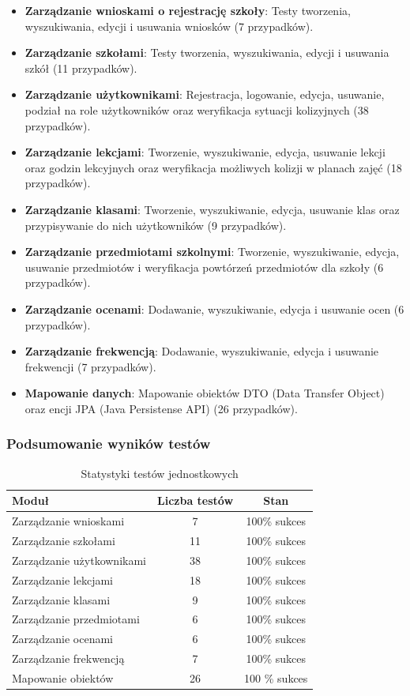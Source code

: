 \documentclass[12pt,a4paper]{article}
\begin{document}
\begin{itemize}
    \item \textbf{Zarządzanie wnioskami o rejestrację szkoły}: Testy tworzenia, wyszukiwania, edycji i usuwania wniosków (7 przypadków).
    \item \textbf{Zarządzanie szkołami}: Testy tworzenia, wyszukiwania, edycji i usuwania szkół (11 przypadków).
    \item \textbf{Zarządzanie użytkownikami}: Rejestracja, logowanie, edycja, usuwanie, podział na role użytkowników oraz weryfikacja sytuacji kolizyjnych (38 przypadków).
    \item \textbf{Zarządzanie lekcjami}: Tworzenie, wyszukiwanie, edycja, usuwanie lekcji oraz godzin lekcyjnych oraz weryfikacja możliwych kolizji w planach zajęć (18 przypadków).
    \item \textbf{Zarządzanie klasami}: Tworzenie, wyszukiwanie, edycja, usuwanie klas oraz przypisywanie do nich użytkowników (9 przypadków).
    \item \textbf{Zarządzanie przedmiotami szkolnymi}: Tworzenie, wyszukiwanie, edycja, usuwanie przedmiotów i weryfikacja powtórzeń przedmiotów dla szkoły (6 przypadków).
    \item \textbf{Zarządzanie ocenami}: Dodawanie, wyszukiwanie, edycja i usuwanie ocen (6 przypadków).
    \item \textbf{Zarządzanie frekwencją}: Dodawanie, wyszukiwanie, edycja i usuwanie frekwencji (7 przypadków).
    \item \textbf{Mapowanie danych}: Mapowanie obiektów DTO (Data Transfer Object) oraz encji JPA (Java Persistense API) (26 przypadków).
\end{itemize}

\subsubsection{Podsumowanie wyników testów}
\begin{table}[H]
    \centering
    \begin{tabular}{|l|c|c|}
        \hline
        \textbf{Moduł} & \textbf{Liczba testów} & \textbf{Stan} \\ \hline
        Zarządzanie wnioskami & 7 & 100\% sukces \\ \hline
        Zarządzanie szkołami & 11 & 100\% sukces \\ \hline
        Zarządzanie użytkownikami & 38 & 100\% sukces \\ \hline
        Zarządzanie lekcjami & 18 & 100\% sukces \\ \hline
        Zarządzanie klasami & 9 & 100\% sukces \\ \hline
        Zarządzanie przedmiotami & 6 & 100\% sukces \\ \hline
        Zarządzanie ocenami & 6 & 100\% sukces \\ \hline
        Zarządzanie frekwencją & 7 & 100\% sukces \\ \hline
        Mapowanie obiektów & 26 & 100 \% sukces \\ \hline
    \end{tabular}
    \caption{Statystyki testów jednostkowych}
\end{table}
\end{document}
